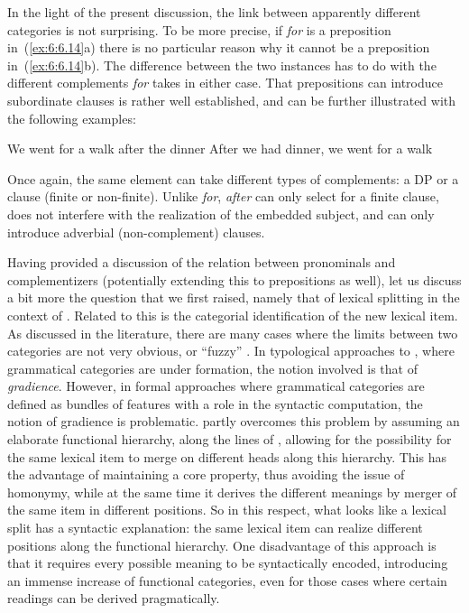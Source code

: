 \documentclass[output=paper]{langsci/langscibook}
\begin{document}
In the light of the present discussion, the link between apparently different
categories is not surprising. To be more precise, if \emph{for} is a
preposition in~(\ref{ex:6:6.14}a) there is no particular reason why it cannot
be a preposition in~(\ref{ex:6:6.14}b). The difference between the two
instances has to do with the different complements \emph{for} takes in either
case. That prepositions can introduce subordinate clauses is rather well
established, and can be further illustrated with the following examples:

\ea\label{ex:6:6.15}
	\ea We went for a walk after the dinner
	\ex After we had dinner, we went for a walk
	\z
\z

Once again, the same element can take different types of complements: a DP or a
clause (finite or non-finite). Unlike \emph{for}, \emph{after} can only select
for a finite clause, does not interfere with the realization of the embedded
subject, and can only introduce adverbial (non-complement) clauses.

Having provided a discussion of the relation between pronominals and
complementizers (potentially extending this to prepositions as well), let us
discuss a bit more the question that we first raised, namely that of lexical
splitting in the context of . Related to this is the
categorial identification of the new lexical item. As discussed in the
literature, there are many cases where the limits between two categories are
not very obvious, or \enquote{fuzzy} \parencite[see][]{TrauTrou2010}. In
typological approaches to , where grammatical
categories are under formation, the notion involved is that of
\emph{gradience}. However, in formal approaches where grammatical categories
are defined as bundles of features with a role in the syntactic computation,
the notion of gradience is problematic.  \citet{Roberts2010b} partly overcomes
this problem by assuming an elaborate functional hierarchy, along the lines of
\citet{Cinque2006}, allowing for the possibility for the same lexical item to
merge on different heads along this hierarchy. This has the advantage of
maintaining a core property, thus avoiding the issue of homonymy, while at the
same time it derives the different meanings by merger of the same item in
different positions. So in this respect, what looks like a lexical split has a
syntactic explanation: the same lexical item can realize different positions
along the functional hierarchy. One disadvantage of this approach is that it
requires every possible meaning to be syntactically encoded, introducing an
immense increase of functional categories, even for those cases where certain
readings can be derived pragmatically.
\end{document}

